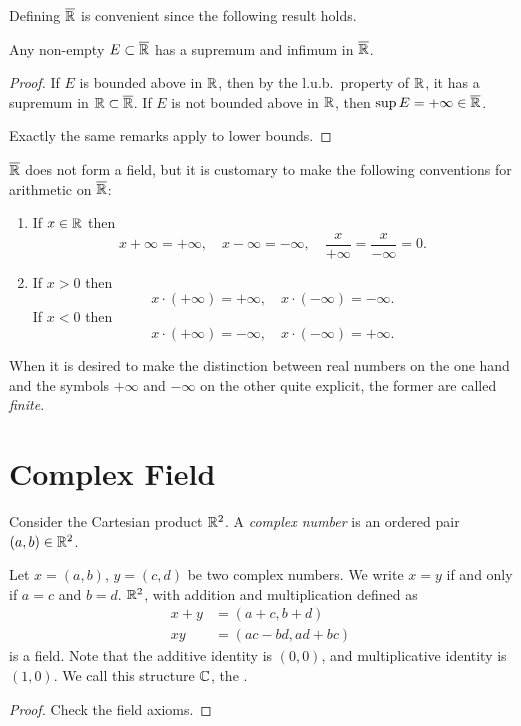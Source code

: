 Defining $\overline{\mathbb R}$ is convenient since the following result holds.

\begin{proposition}
Any non-empty $E\subset\overline{\mathbb R}$ has a supremum and infimum in $\overline{\mathbb R}$.
\end{proposition}

\begin{proof}
If $E$ is bounded above in $\mathbb R$, then by the l.u.b.\ property of $\mathbb R$, it has a supremum in $\mathbb R\subset\overline{\mathbb R}$. If $E$ is not bounded above in $\mathbb R$, then $\sup E=+\infty\in\overline{\mathbb R}$.

Exactly the same remarks apply to lower bounds.
\end{proof}

$\overline{\mathbb R}$ does not form a field, but it is customary to make the following conventions for arithmetic on $\overline{\mathbb R}$:
\begin{enumerate}[label=(\roman*)]
\item If $x\in\mathbb R$ then
\[ x+\infty=+\infty, \quad x-\infty=-\infty, \quad \frac{x}{+\infty}=\frac{x}{-\infty}=0. \]
\item If $x>0$ then
\[x\cdot(+\infty)=+\infty,\quad x\cdot(-\infty)=-\infty.\]
If $x<0$ then
\[x\cdot(+\infty)=-\infty,\quad x\cdot(-\infty)=+\infty.\]
\end{enumerate}
When it is desired to make the distinction between real numbers on the one hand and the symbols $+\infty$ and $-\infty$ on the other quite explicit, the former are called \emph{finite}.
\pagebreak
\section{Complex Field}
Consider the Cartesian product $\mathbb R^2$. A \emph{complex number} is an ordered pair $(a,b)\in\mathbb R^2$. 

\begin{proposition}
Let $x=(a,b)$, $y=(c,d)$ be two complex numbers. We write $x=y$ if and only if $a=c$ and $b=d$. $\mathbb R^2$, with addition and multiplication defined as
\begin{align*}
x+y&=(a+c,b+d)\\
xy&=(ac-bd,ad+bc)
\end{align*}
is a field. Note that the additive identity is $(0,0)$, and multiplicative identity is $(1,0)$. We call this structure $\mathbb C$, the .
\end{proposition}

\begin{proof}
Check the field axioms.
\end{proof}

